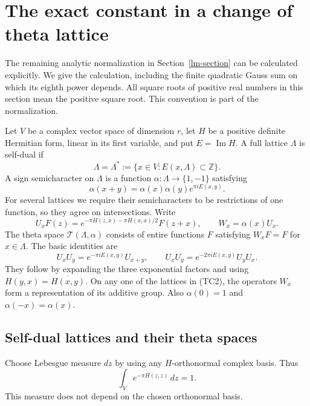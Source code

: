 \section{The exact constant in a change of theta lattice}
\label{tc-section}

The remaining analytic normalization in Section~\ref{lm-section}
can be calculated explicitly.  We give the calculation, including
the finite quadratic Gauss sum on which its eighth power depends.
All square roots of positive real numbers in this section mean
the positive square root.  This convention is part of the
normalization.

Let $V$ be a complex vector space of dimension $r$, let $H$ be a
positive definite Hermitian form, linear in its first variable,
and put $E=\operatorname{Im}H$.  A full lattice $\Lambda$ is
self-dual if
\[
 \Lambda=\Lambda^*
   :=\{x\in V:E(x,\Lambda)\subset\mathbb Z\}.
 \tag{TC1}
\]
A sign semicharacter on $\Lambda$ is a function
$\alpha:\Lambda\to\{1,-1\}$ satisfying
\[
 \alpha(x+y)=\alpha(x)\alpha(y)e^{\pi iE(x,y)}.
 \tag{TC2}
\]
For several lattices we require their semicharacters to be
restrictions of one function, so they agree on intersections.
Write
\[
 U_xF(z)=e^{-\pi H(z,x)-\pi H(x,x)/2}F(z+x),
 \qquad W_x=\alpha(x)U_x.
 \tag{TC3}
\]
The theta space $\mathcal T(\Lambda,\alpha)$ consists of entire
functions $F$ satisfying $W_xF=F$ for $x\in\Lambda$.
The basic identities are
\[
 U_xU_y=e^{-\pi iE(x,y)}U_{x+y},\qquad
 U_xU_y=e^{-2\pi iE(x,y)}U_yU_x.
 \tag{TC4}
\]
They follow by expanding the three exponential factors and using
$H(y,x)=\overline{H(x,y)}$.  On any one of the lattices in
(TC2), the operators $W_x$ form a representation of its additive
group.  Also $\alpha(0)=1$ and $\alpha(-x)=\alpha(x)$.

\subsection{Self-dual lattices and their theta spaces}

Choose Lebesgue measure $dz$ by using any $H$-orthonormal complex
basis.  Thus
\[
                  \int_V e^{-\pi H(z,z)}\,dz=1.
 \tag{TC5}
\]
This measure does not depend on the chosen orthonormal basis.

